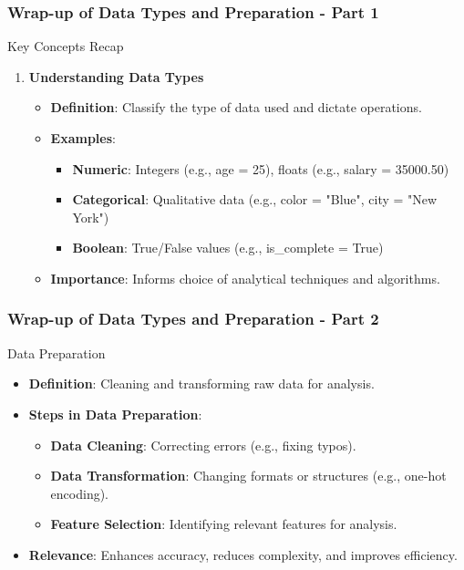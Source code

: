\documentclass{beamer}
\begin{document}
\begin{frame}[fragile]
    \frametitle{Wrap-up of Data Types and Preparation - Part 1}
    \begin{block}{Key Concepts Recap}
        \begin{enumerate}
            \item \textbf{Understanding Data Types}
            \begin{itemize}
                \item \textbf{Definition}: Classify the type of data used and dictate operations.
                \item \textbf{Examples}:
                \begin{itemize}
                    \item \textbf{Numeric}: Integers (e.g., age = 25), floats (e.g., salary = 35000.50)
                    \item \textbf{Categorical}: Qualitative data (e.g., color = "Blue", city = "New York")
                    \item \textbf{Boolean}: True/False values (e.g., is\_complete = True)
                \end{itemize}
                \item \textbf{Importance}: Informs choice of analytical techniques and algorithms.
            \end{itemize}
        \end{enumerate}
    \end{block}
\end{frame}

\begin{frame}[fragile]
    \frametitle{Wrap-up of Data Types and Preparation - Part 2}
    \begin{block}{Data Preparation}
        \begin{itemize}
            \item \textbf{Definition}: Cleaning and transforming raw data for analysis.
            \item \textbf{Steps in Data Preparation}:
            \begin{itemize}
                \item \textbf{Data Cleaning}: Correcting errors (e.g., fixing typos).
                \item \textbf{Data Transformation}: Changing formats or structures (e.g., one-hot encoding).
                \item \textbf{Feature Selection}: Identifying relevant features for analysis.
            \end{itemize}
            \item \textbf{Relevance}: Enhances accuracy, reduces complexity, and improves efficiency.
        \end{itemize}
    \end{block}
\end{frame}
\end{document}

